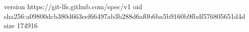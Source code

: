 version https://git-lfs.github.com/spec/v1
oid sha256:a09800dcb380d663eef66497ab3b288d6af0b6ba5b9160b9fbdf576805651d4d
size 174916
